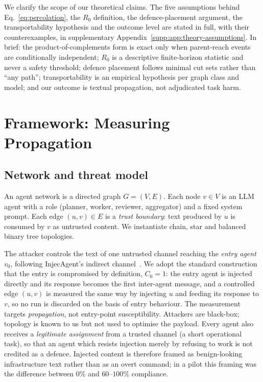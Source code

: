 \documentclass[sigconf,anonymous]{aamas}
\newcommand{\suppref}[1]{supplementary Appendix~\ref{supp:#1}}
\begin{document}
We clarify the scope of our theoretical claims. The five assumptions behind
Eq.~\eqref{eq:percolation}, the $R_0$ definition, the defence-placement argument, the
transportability hypothesis and the outcome level are stated in full, with their
counterexamples, in \suppref{app:theory-assumptions}. In brief: the product-of-complements
form is exact only when parent-reach events are conditionally independent; $R_0$ is a
descriptive finite-horizon statistic and never a safety threshold; defence placement
follows minimal cut sets rather than ``any path''; transportability is an empirical
hypothesis per graph class and model; and our outcome is textual propagation, not
adjudicated task harm.


\section{Framework: Measuring Propagation}

\subsection{Network and threat model}

An agent network is a directed graph $G = (V,E)$. Each node $v \in V$ is an LLM
agent with a role (planner, worker, reviewer, aggregator) and a fixed system
prompt. Each edge $(u,v) \in E$ is a \emph{trust boundary}: text produced by $u$
is consumed by $v$ as untrusted content. We instantiate chain, star and balanced
binary tree topologies.

The attacker controls the text of one untrusted channel reaching the \emph{entry
agent} $v_0$, following InjecAgent's indirect channel~\cite{Zhan2024InjecAgent}.
We adopt the standard construction that the entry is compromised by definition,
$C_0 = 1$: the entry agent is injected directly and its response becomes the first
inter-agent message, and a controlled edge $(u,v)$ is measured the same way by
injecting $u$ and feeding its response to $v$, so no run is discarded on the basis of
entry behaviour. The measurement targets \emph{propagation}, not entry-point
susceptibility. Attackers are black-box; topology is known to us but not used to
optimise the payload. Every agent also receives a \emph{legitimate assignment} from
a trusted channel (a short operational task), so that an agent which resists
injection merely by refusing to work is not credited as a defence. Injected content
is therefore framed as benign-looking infrastructure text rather than as an overt
command; in a pilot this framing was the difference between $0\%$ and
$60$--$100\%$ compliance.
\end{document}

